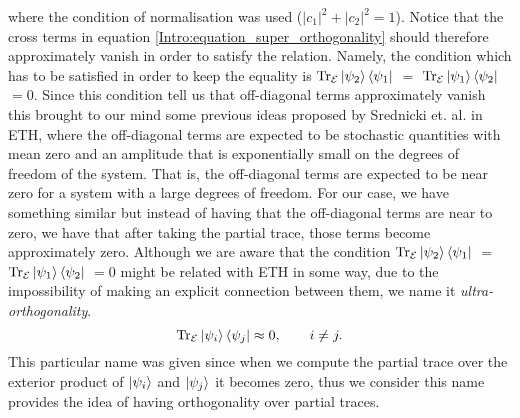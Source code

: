 where the condition of normalisation was used ($|c_1|^2 + |c_2|^2 =1$). Notice that the cross terms in equation \eqref{Intro:equation_super_orthogonality} should therefore approximately vanish in order to satisfy the relation. Namely, the condition which has to be satisfied in order to keep the equality is $\operatorname{Tr}_{\mathcal{E}}\mathinner{|{\psi_2}\rangle}\mathinner{\langle{\psi_1}|}$ $=$ $\operatorname{Tr}_{\mathcal{E}}\mathinner{|{\psi_1}\rangle}\mathinner{\langle{\psi_2}|}$ $=0$. Since this condition tell us that off-diagonal terms approximately vanish this brought to our mind some previous ideas proposed by Srednicki et. al.\cite{srednicki_chaos_1994,deutsch_quantum_1991,rigol_alternatives_2012} in ETH, where the off-diagonal terms are expected to be stochastic quantities with mean zero and an amplitude that is exponentially small on the degrees of freedom of the system. That is, the off-diagonal terms are expected to be near zero for a system with a large degrees of freedom. For our case, we have something similar but instead of having that the off-diagonal terms are near to zero, we have that after taking the partial trace, those terms become approximately zero. Although we are aware that the condition $\operatorname{Tr}_{\mathcal{E}}\mathinner{|{\psi_2}\rangle}\mathinner{\langle{\psi_1}|}$ $=$ $\operatorname{Tr}_{\mathcal{E}}\mathinner{|{\psi_1}\rangle}\mathinner{\langle{\psi_2}|}$ $=0$ might be related with ETH in some way, due to the impossibility of making an explicit connection between them, we name it \textit{ultra-orthogonality}. 
\begin{equation}
\operatorname{Tr}_{\mathcal{E}}\mathinner{|{\psi_i}\rangle}\mathinner{\langle{\psi_j}|} \approx 0,\quad \quad i\neq j.
\label{Intro:Condition_ultraorthogonality}
\end{equation}
This particular name was given since when we compute the partial trace over the exterior product of $\mathinner{|{\psi_i}\rangle}$ and $\mathinner{|{\psi_j}\rangle}$ it becomes zero, thus we consider this name provides the idea of having orthogonality over partial traces.\\

